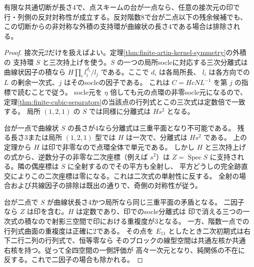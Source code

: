 \begin{corollary}\label{cor:single-support-quartic-slice}
有限な共通切断が長さ4で、点スキームの台が一点なら、任意の接次元の印で
行・列側の反対対称性が成立する。反対階数8で台が二点以下の残余候補でも、
この切断からの非対称な外積の支持環が曲線状の長さ4である場合は排除される。
\end{corollary}
\begin{proof}
接次元2だけを扱えばよい。定理\ref{thm:finite-artin-kernel-symmetry}の外積の
支持環 $S$ と三次持上げを使う。$S$ の一つの局所socleに対応する三次分離式は
曲線状因子の積なら $H\prod_i l_i^{d_i}/l_j$ である。ここで $d_i$ は各局所長、
$l_i$ は各方向での $L$ の剰余一次式、$j$ はそのsocleの因子である。
これは $C=H c N L^{-1}$ を第 $j$ の指標で読むことで従う。
socle元を $\eta$ 倍しても元の点環の非零socle元になるので、
定理\ref{thm:finite-cubic-separators}の当該点の行列式とこの三次式は定数倍で一致する。
局所 $(1,2,1)$ の $S$ では同様に分離式は $H s^2$ となる。

台が一点で曲線状 $S$ の長さが4なら分離式は三重平面となり不可能である。
残る長さ3または局所 $(1,2,1)$ 型では $H$ は一次で、分離式は $H s^2$ である。
上の定理から $H$ は印で非零なので点環全体で単元である。
しかし $H$ と三次持上げの式から、逆数分子の非零な二次座標（例えば $s^2$）は
$Z=\operatorname{Spec}S$ に支持される。隣の偶座標は $S$ に全射するのでその平方も全射し、
平方どうしの完全跡直交によりこの二次座標は零になる。これは二次式の単射性に反する。
全射の場合および共線因子の排除は既出の通りで、奇側の対称性が従う。

台が二点で $S$ が曲線状長さ4かつ局所なら同じ三重平面の矛盾となる。
二因子なら $Z$ は印を含む。$H$ は定数であり、印でのsocle分離式は
印で消える三つの一次式の積なので射影三空間で印における重複度が3となる。
一方、階数一点での行列式曲面の重複度は正確に2である。
その点を $E_{11}$ としたとき二次初期式は右下二行二列の行列式で、恒等零なら
そのブロックの線型空間は共通左核か共通右核を持つ。従って全四空間の一側評価が
高々一次元となり、純関係の不在に反する。これで二因子の場合も除かれる。
\end{proof}
